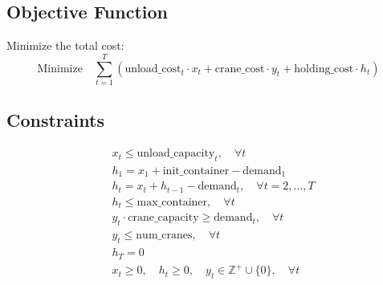 \documentclass{article}
\begin{document}
\subsection*{Objective Function}
Minimize the total cost:
\[
\text{Minimize} \quad \sum_{t=1}^{T} \left( \text{unload\_cost}_t \cdot x_t + \text{crane\_cost} \cdot y_t + \text{holding\_cost} \cdot h_t \right)
\]

\subsection*{Constraints}
\begin{align}
    & x_t \leq \text{unload\_capacity}_t, \quad \forall t \label{eq:unload_capacity} \\
    & h_1 = x_1 + \text{init\_container} - \text{demand}_1 \label{eq:init_balance} \\
    & h_t = x_t + h_{t-1} - \text{demand}_t, \quad \forall t = 2, \ldots, T \label{eq:balance} \\
    & h_t \leq \text{max\_container}, \quad \forall t \label{eq:max_storage} \\
    & y_t \cdot \text{crane\_capacity} \geq \text{demand}_t, \quad \forall t \label{eq:crane_capacity} \\
    & y_t \leq \text{num\_cranes}, \quad \forall t \label{eq:max_cranes} \\
    & h_T = 0 \label{eq:end_balance} \\
    & x_t \geq 0, \quad h_t \geq 0, \quad y_t \in \mathbb{Z}^+ \cup \{0\}, \quad \forall t \label{eq:nonnegative}
\end{align}
\end{document}
